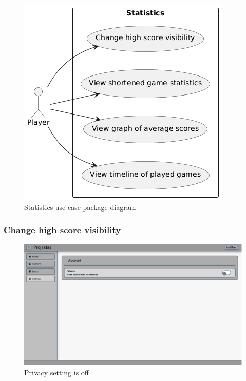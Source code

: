 \documentclass[11pt,a4paper]{article}
\begin{document}
\begin{figure}[H]
    \centering
    \includegraphics[keepaspectratio]{PSI_3rd_trial/use_case_high_score.png}
    \caption{Statistics use case package diagram}
    \label{fig:statistics_package}
\end{figure}

\subsubsection{Change high score visibility}

\begin{figure}[H]
    \centering
    \includegraphics[width=1\textwidth,keepaspectratio]{PSI_3rd_trial/PNGs/privacy_settings_off.png}
    \caption{Privacy setting is off}
    \label{fig:privacy_settings_off}
\end{figure}
\end{document}
